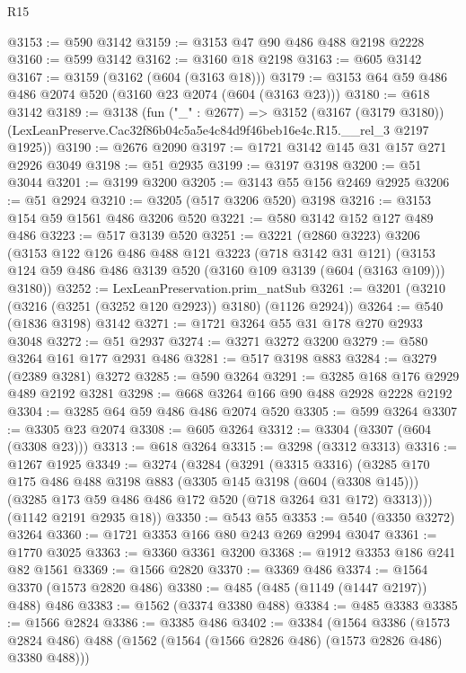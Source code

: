 \begin{lexlean}{R15}
\begin{coremodule}
@3153 := @590 @3142
@3159 := @3153 @47 @90 @486 @488 @2198 @2228
@3160 := @599 @3142
@3162 := @3160 @18 @2198
@3163 := @605 @3142
@3167 := @3159 (@3162 (@604 (@3163 @18)))
@3179 := @3153 @64 @59 @486 @486 @2074 @520 (@3160 @23 @2074 (@604 (@3163 @23)))
@3180 := @618 @3142
@3189 := @3138
    (fun ("_" : @2677) =>
    @3152
      (@3167 (@3179 @3180))
      (LexLeanPreserve.Cac32f86b04c5a5e4c84d9f46beb16e4c.R15.__rel_3 @2197 @1925))
@3190 := @2676 @2090
@3197 := @1721 @3142 @145 @31 @157 @271 @2926 @3049
@3198 := @51 @2935
@3199 := @3197 @3198
@3200 := @51 @3044
@3201 := @3199 @3200
@3205 := @3143 @55 @156 @2469 @2925
@3206 := @51 @2924
@3210 := @3205 (@517 @3206 @520) @3198
@3216 := @3153 @154 @59 @1561 @486 @3206 @520
@3221 := @580 @3142 @152 @127 @489 @486
@3223 := @517 @3139 @520
@3251 := @3221
    (@2860 @3223)
    @3206
    (@3153
      @122
      @126
      @486
      @488
      @121
      @3223
      (@718 @3142 @31 @121)
      (@3153 @124 @59 @486 @486 @3139 @520 (@3160 @109 @3139 (@604 (@3163 @109))) @3180))
@3252 := LexLeanPreservation.prim_natSub
@3261 := @3201 (@3210 (@3216 (@3251 (@3252 @120 @2923)) @3180) (@1126 @2924))
@3264 := @540 (@1836 @3198) @3142
@3271 := @1721 @3264 @55 @31 @178 @270 @2933 @3048
@3272 := @51 @2937
@3274 := @3271 @3272 @3200
@3279 := @580 @3264 @161 @177 @2931 @486
@3281 := @517 @3198 @883
@3284 := @3279 (@2389 @3281) @3272
@3285 := @590 @3264
@3291 := @3285 @168 @176 @2929 @489 @2192 @3281
@3298 := @668 @3264 @166 @90 @488 @2928 @2228 @2192
@3304 := @3285 @64 @59 @486 @486 @2074 @520
@3305 := @599 @3264
@3307 := @3305 @23 @2074
@3308 := @605 @3264
@3312 := @3304 (@3307 (@604 (@3308 @23)))
@3313 := @618 @3264
@3315 := @3298 (@3312 @3313)
@3316 := @1267 @1925
@3349 := @3274
    (@3284
      (@3291
        (@3315 @3316)
        (@3285
          @170
          @175
          @486
          @488
          @3198
          @883
          (@3305 @145 @3198 (@604 (@3308 @145)))
          (@3285 @173 @59 @486 @486 @172 @520 (@718 @3264 @31 @172) @3313)))
      (@1142 @2191 @2935 @18))
@3350 := @543 @55
@3353 := @540 (@3350 @3272) @3264
@3360 := @1721 @3353 @166 @80 @243 @269 @2994 @3047
@3361 := @1770 @3025
@3363 := @3360 @3361 @3200
@3368 := @1912 @3353 @186 @241 @82 @1561
@3369 := @1566 @2820
@3370 := @3369 @486
@3374 := @1564 @3370 (@1573 @2820 @486)
@3380 := @485 (@485 (@1149 (@1447 @2197)) @488) @486
@3383 := @1562 (@3374 @3380 @488)
@3384 := @485 @3383
@3385 := @1566 @2824
@3386 := @3385 @486
@3402 := @3384
    (@1564
      @3386
      (@1573 @2824 @486)
      @488
      (@1562 (@1564 (@1566 @2826 @486) (@1573 @2826 @486) @3380 @488)))

\end{coremodule}
\end{lexlean}
